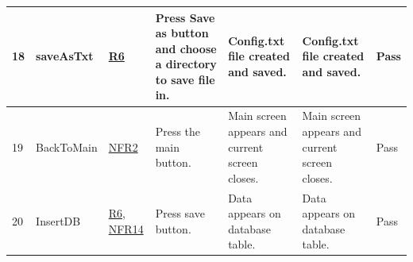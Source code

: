 \documentclass[12pt, titlepage]{article}
\begin{document}
\begin{center}
\begin{table}
\begin{tabular}{ | p{0.5cm} | p{2.8cm} |  p{1.1cm} | p{2.7cm} | p{2.7cm} | p{2.7cm} | p{1.1cm} |}
\hline
18 & saveAsTxt & \href{https://github.com/zakerl/Capstone_Project/blob/main/docs/SRS/SRS.pdf}{R6} & Press Save as button and choose a directory to save file in. & Config.txt file created and saved. & Config.txt file created and saved. & Pass \\ 
\hline
19 & BackToMain & \href{https://github.com/zakerl/Capstone_Project/blob/main/docs/SRS/SRS.pdf}{NFR2} & Press the main button. & Main screen appears and current screen closes. & Main screen appears and current screen closes. & Pass \\ 
\hline
20 &  InsertDB & \href{https://github.com/zakerl/Capstone_Project/blob/main/docs/SRS/SRS.pdf}{R6, NFR14} & Press save button. & Data appears on database table. & Data appears on database table. & Pass \\ 
\hline
\end{tabular}
\end{table}
\end{center}
\end{document}
